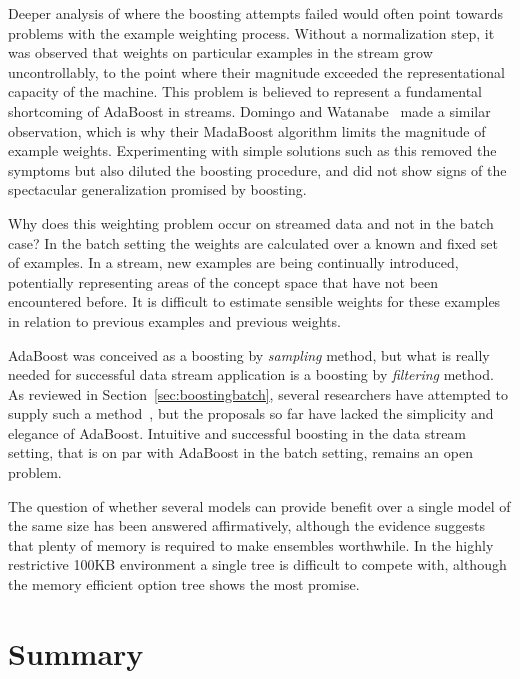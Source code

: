 Deeper analysis of where the boosting attempts failed would often point towards problems with the example weighting process. Without a normalization step, it was observed that weights on particular examples in the stream grow uncontrollably, to the point where their magnitude exceeded the representational capacity of the machine. This problem is believed to represent a fundamental shortcoming of AdaBoost in streams. Domingo and Watanabe~\cite{madaboost} made a similar observation, which is why their MadaBoost algorithm limits the magnitude of example weights. Experimenting with simple solutions such as this removed the symptoms but also diluted the boosting procedure, and did not show signs of the spectacular generalization promised by boosting.

Why does this weighting problem occur on streamed data and not in the batch case? In the batch setting the weights are calculated over a known and fixed set of examples. In a stream, new examples are being continually introduced, potentially representing areas of the concept space that have not been encountered before. It is difficult to estimate sensible weights for these examples in relation to previous examples and previous weights.

AdaBoost was conceived as a boosting by {\em sampling} method, but what is really needed for successful data stream application is a boosting by {\em filtering} method. As reviewed in Section~\ref{sec:boostingbatch}, several researchers have attempted to supply such a method~\cite{madaboost, polyboost}, but the proposals so far have lacked the simplicity and elegance of AdaBoost. Intuitive and successful boosting in the data stream setting, that is on par with AdaBoost in the batch setting, remains an open problem.

The question of whether several models can provide benefit over a single model of the same size has been answered affirmatively, although the evidence suggests that plenty of memory is required to make ensembles worthwhile. In the highly restrictive 100KB environment a single tree is difficult to compete with, although the memory efficient option tree shows the most promise.

\section{Summary}

